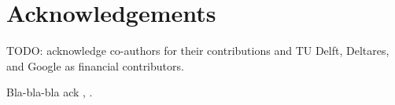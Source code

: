\chapter*{Acknowledgements}
\label{acknowledgements}

TODO: acknowledge co-authors for their contributions and TU Delft, Deltares, and Google as financial contributors.


Bla-bla-bla ack \cite{donchyts2016earth}, \cite{Einstein1906}.
